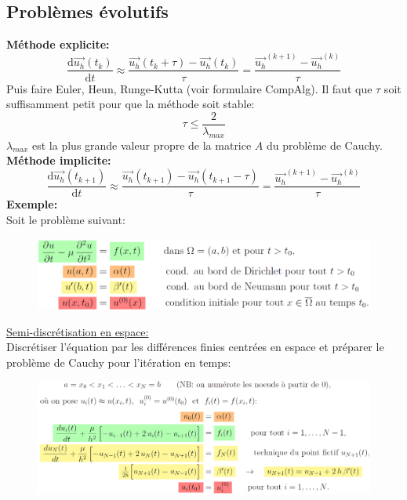 \subsection*{Problèmes évolutifs}
\textbf{Méthode explicite:}
\begin{equation*}
    \boxed{\frac{\mathrm{d}\overrightarrow{u_h}(t_k)}{\mathrm{d}t}\approx \frac{\overrightarrow{u_h}(t_k+\tau)-\overrightarrow{u_h}(t_k)}{\tau}=\frac{\overrightarrow{u_h}^{(k+1)}-\overrightarrow{u_h}^{(k)}}{\tau}}
\end{equation*}
Puis faire Euler, Heun, Runge-Kutta (voir formulaire CompAlg).
Il faut que $\tau$ soit suffisamment petit pour que la méthode soit stable:
\begin{equation*}
    \tau\leq \frac{2}{\lambda_{max}}
\end{equation*}
$\lambda_{max}$ est la plus grande valeur propre de la matrice $A$ du problème de Cauchy.\\
\textbf{Méthode implicite:}
\begin{equation*}
    \boxed{\frac{\mathrm{d}\overrightarrow{u_h}(t_{k+1})}{\mathrm{d}t}\approx \frac{\overrightarrow{u_h}(t_{k+1})-\overrightarrow{u_h}(t_{k+1}-\tau)}{\tau}=\frac{\overrightarrow{u_h}^{(k+1)}-\overrightarrow{u_h}^{(k)}}{\tau}}
\end{equation*}
\textbf{Exemple:}\\
Soit le problème suivant:
\begin{figure}[H]
    \centering
    \includegraphics[width=\columnwidth]{images/semaine12_exemple_evolutif1.png}
\end{figure}
\underline{Semi-discrétisation en espace:}\\
Discrétiser l'équation par les différences finies centrées en espace et préparer le
problème de Cauchy pour l'itération en temps:
\begin{figure}[H]
    \centering
    \includegraphics[width=\columnwidth]{images/semaine12_exemple_evolutif2.png}
\end{figure}
